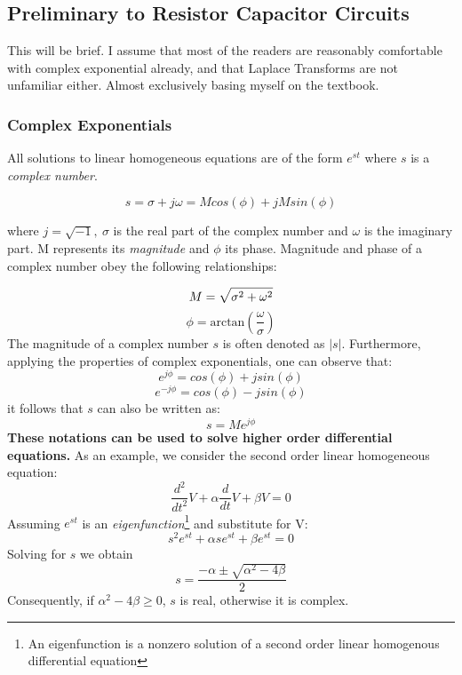 \subsection{Preliminary to Resistor Capacitor Circuits}

This will be brief. I assume that most of the readers are reasonably comfortable with complex exponential already, and that Laplace Transforms are not unfamiliar either. Almost exclusively basing myself on the textbook. 

\subsubsection{Complex Exponentials}

All solutions to linear homogeneous equations are of the form $e^{st}$ where $s$ is a \textit{complex number}.

\begin{equation}
    s = \sigma + j\omega = M cos(\phi) + j M sin(\phi)
\end{equation}

where $j = \sqrt{-1},\ \sigma$ is the real part of the complex number and $\omega$ is the imaginary part. M represents its \textit{magnitude} and $\phi$ its phase. Magnitude and phase of a complex number obey the following relationships: 

\begin{equation}
    M = \sqrt{\sigma^2 + \omega^2}\\
\end{equation}
\begin{equation}
    \phi = \mathrm{arctan} (\frac{\omega}{\sigma})
\end{equation}
The magnitude of a complex number $s$ is often denoted as $|s|$. Furthermore,
applying the properties of complex exponentials, one can observe that:
\begin{equation}
    e^{j\phi} = cos(\phi) + j sin(\phi)
\end{equation}
\begin{equation}
    e^{-j\phi} = cos(\phi) - j sin(\phi)
\end{equation}
it follows that $s$ can also be written as: 
\begin{equation}
    s = Me^{j\phi}
\end{equation}
\textbf{These notations can be used to solve higher order differential equations.} As an example, we consider the second order linear homogeneous equation: 
\begin{equation}
    \frac{d^2}{dt^2}V + \alpha \frac{d}{dt}V + \beta V = 0
\end{equation}
Assuming $e^{st}$ is an \textit{eigenfunction}\footnote{An eigenfunction is a nonzero solution of a second order linear homogenous differential equation} and substitute for V: 
\begin{equation}
    s^2e^{st} + \alpha se^{st} + \beta e^{st} = 0
\end{equation}
Solving for $s$ we obtain
\begin{equation}
    s = \frac{-\alpha \pm \sqrt{\alpha^2 -4\beta}}{2}
\end{equation}
Consequently, if $\alpha^2 -4\beta \geq 0$, $s$ is real, otherwise it is complex. 


